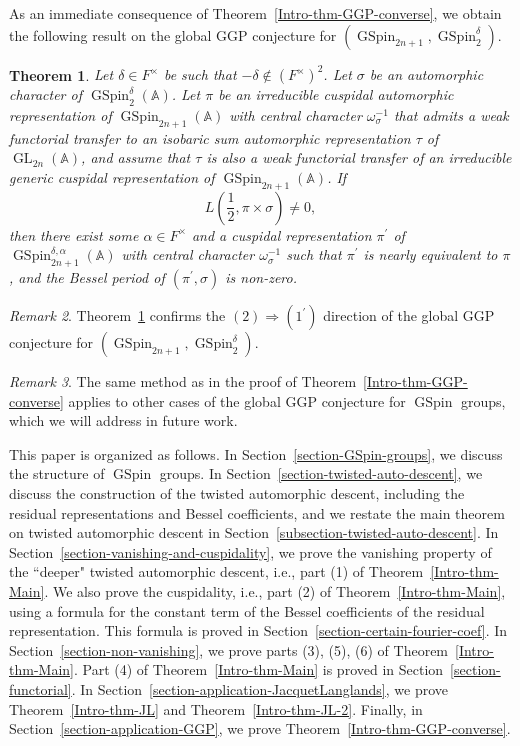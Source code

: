 \documentclass[12pt]{amsart}
\newcommand{\A}{\mathbb{A}}
\newtheorem{theorem}{Theorem}[section]
\theoremstyle{remark}
\newtheorem{remark}[theorem]{Remark}%
\DeclareMathOperator{\GL}{GL}
\DeclareMathOperator{\GSpin}{GSpin}
\begin{document}
As an immediate consequence of Theorem~\ref{Intro-thm-GGP-converse}, we obtain the following result on the  global GGP conjecture for $(\GSpin_{2n+1}, \GSpin_2^\delta)$.

\begin{theorem}
\label{Intro-thm-GGP-converse-concise}
Let $\delta\in F^\times$ be such that $-\delta\not\in (F^\times)^2$. 
Let $\sigma$ be an automorphic character of $\GSpin_2^{\delta}(\A)$.
Let $\pi$ be an irreducible cuspidal automorphic representation of $\GSpin_{2n+1}(\A)$ with central character $\omega_{\sigma}^{-1}$ that admits a weak functorial transfer to an isobaric sum automorphic representation $\tau$ of $\GL_{2n}(\A)$, and assume that $\tau$ is also a weak functorial transfer of an irreducible generic cuspidal representation of $\GSpin_{2n+1}(\A)$.
If
\begin{equation*}
L(\frac{1}{2}, \pi\times\sigma )\not=0,	
\end{equation*}
then there exist some $\alpha\in F^\times$ and a cuspidal representation $\pi^\prime$ of $\GSpin_{2n+1}^{\delta, \alpha}(\A)$ with central character $\omega_{\sigma}^{-1}$ such that $\pi^\prime$ is nearly equivalent to $\pi$, and 
	the Bessel period of $(\pi^\prime, \sigma)$ is non-zero.
\end{theorem}

\begin{remark}
Theorem~\ref{Intro-thm-GGP-converse-concise} confirms the $(2)\Rightarrow (1^\prime)$ direction of the global GGP conjecture for $(\GSpin_{2n+1}, \GSpin_2^\delta)$. 
\end{remark}


 

\begin{remark}
The same method as in the proof of Theorem~\ref{Intro-thm-GGP-converse} applies to other cases of the global GGP conjecture for $\GSpin$ groups, which we will address in future work.	
\end{remark}




This paper is organized as follows. 
In Section~\ref{section-GSpin-groups}, we discuss the structure of $\GSpin$ groups.
In Section~\ref{section-twisted-auto-descent}, we discuss the construction of the twisted automorphic descent, including the residual representations and Bessel coefficients, and we restate the main theorem on twisted automorphic descent in Section~\ref{subsection-twisted-auto-descent}. In Section~\ref{section-vanishing-and-cuspidality}, we prove the vanishing property of the ``deeper" twisted automorphic descent, i.e., part (1) of Theorem~\ref{Intro-thm-Main}. We also prove the cuspidality, i.e., part (2) of Theorem~\ref{Intro-thm-Main}, using a formula for the constant term of the Bessel coefficients of the residual representation. This formula is proved in Section~\ref{section-certain-fourier-coef}. In Section~\ref{section-non-vanishing}, we prove parts (3), (5), (6) of Theorem~\ref{Intro-thm-Main}. Part (4) of Theorem~\ref{Intro-thm-Main} is proved in Section~\ref{section-functorial}. In Section~\ref{section-application-JacquetLanglands}, we prove Theorem~\ref{Intro-thm-JL} and Theorem~\ref{Intro-thm-JL-2}. Finally, in Section~\ref{section-application-GGP}, we prove Theorem~\ref{Intro-thm-GGP-converse}.
\end{document}

